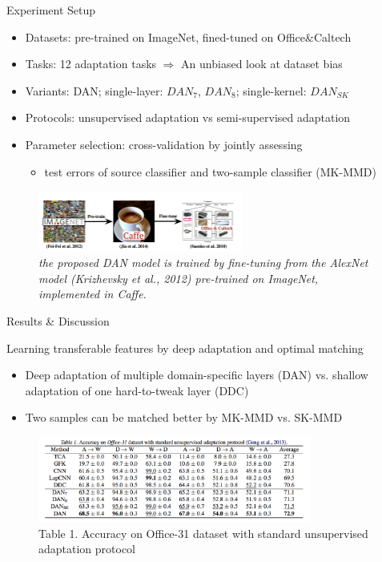 \documentclass{beamer}
\begin{document}
\begin{frame}[fragile]{Experiment Setup}
\begin{itemize}
\item{Datasets: pre-trained on ImageNet, fined-tuned on Office\&Caltech}
\item{Tasks: 12 adaptation tasks $\Rightarrow$ An unbiased look at dataset bias}
\item{Variants: DAN; single-layer: $DAN_7$, $DAN_8$; single-kernel: $DAN_{SK}$}
\item{Protocols: unsupervised adaptation vs semi-supervised adaptation}
\item{Parameter selection: cross-validation by jointly assessing}
  \begin{itemize}
  \item{test errors of source classifier and two-sample classifier (MK-MMD)}
  \end{itemize}
\end{itemize}

\begin{figure}[h]
    \centering
    \includegraphics[width=0.6\textwidth]{fig4}
    \caption{\emph{the proposed DAN model is trained by fine-tuning from the AlexNet model (Krizhevsky et al., 2012) pre-trained on ImageNet, implemented in Caffe.}}
    \label{fig:mesh2}
\end{figure}
\end{frame}

\begin{frame}[fragile]{Results \& Discussion}
\begin{block}{Learning transferable features by deep adaptation and optimal matching}
\begin{itemize}
\item{Deep adaptation of multiple domain-specific layers (DAN) vs. shallow adaptation of one hard-to-tweak layer (DDC)}
\item{Two samples can be matched better by MK-MMD vs. SK-MMD}
\end{itemize}
\end{block}
\begin{figure}[h]
    \centering
    \includegraphics[width=0.8\textwidth]{table1}
    \caption{Table 1. Accuracy on Office-31 dataset with standard unsupervised adaptation protocol }
    \label{fig:mesh2}
\end{figure}
\end{frame}
\end{document}

